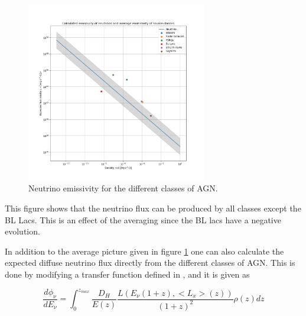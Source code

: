 \begin{figure}[H]
    \centering
    \includegraphics[width = 0.7\textwidth]{new_plots/L_n_neut_calc.png}
    \caption{Neutrino emissivity for the different classes of AGN.}
    \label{fig:neutrino}
\end{figure}

This figure shows that the neutrino flux can be produced by all classes except 
the BL Lacs. This is an effect of the averaging since the BL lacs have a negative evolution.


In addition to the average picture given in figure \ref*{fig:neutrino} one can also calculate the expected diffuse neutrino flux directly from the different classes of AGN. This is done by modifying a transfer function defined in \cite{Palladino_2020}, and it is given as


\begin{equation}
    \frac{d\phi_\nu}{dE_\nu} = \int_0^{z_{max}} \frac{D_H}{E(z)} \frac{L(E_\nu (1+z),<L_x>(z))}{(1+z)^2} \rho(z) dz
\end{equation}

